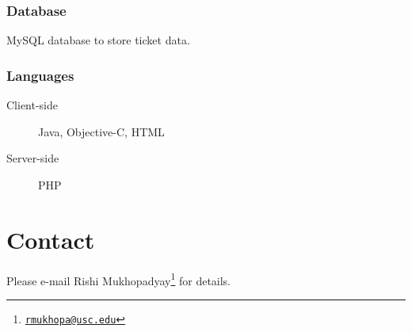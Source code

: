 \documentclass[]{article}
\begin{document}
			\subsubsection{Database}
				MySQL database to store ticket data.
			\subsubsection{Languages}
				\begin{description}
					\item[Client-side] Java, Objective-C, HTML
					\item[Server-side] PHP
				\end{description}
	
\section{Contact}
Please e-mail Rishi Mukhopadyay\footnote{\href{mailto:rmukhopa@usc.edu}{\texttt{rmukhopa@usc.edu}}} for details.
\end{document}
